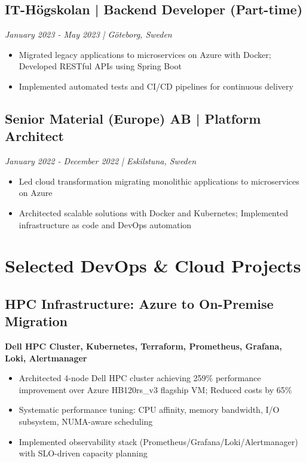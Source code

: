 \documentclass[11pt,a4paper]{article}
\begin{document}
\subsection*{IT-Högskolan | Backend Developer (Part-time)}
\textit{January 2023 - May 2023 | Göteborg, Sweden}
\begin{itemize}[noitemsep]
\item Migrated legacy applications to microservices on Azure with Docker; Developed RESTful APIs using Spring Boot
\item Implemented automated tests and CI/CD pipelines for continuous delivery
\end{itemize}

\subsection*{Senior Material (Europe) AB | Platform Architect}
\textit{January 2022 - December 2022 | Eskilstuna, Sweden}
\begin{itemize}[noitemsep]
\item Led cloud transformation migrating monolithic applications to microservices on Azure
\item Architected scalable solutions with Docker and Kubernetes; Implemented infrastructure as code and DevOps automation
\end{itemize}

\section*{Selected DevOps \& Cloud Projects}

\subsection{HPC Infrastructure: Azure to On-Premise Migration}
\textbf{Dell HPC Cluster, Kubernetes, Terraform, Prometheus, Grafana, Loki, Alertmanager}
\begin{itemize}[noitemsep]
\item Architected 4-node Dell HPC cluster achieving 259\% performance improvement over Azure HB120rs\_v3 flagship VM; Reduced costs by 65\%
\item Systematic performance tuning: CPU affinity, memory bandwidth, I/O subsystem, NUMA-aware scheduling
\item Implemented observability stack (Prometheus/Grafana/Loki/Alertmanager) with SLO-driven capacity planning
\end{itemize}
\end{document}
